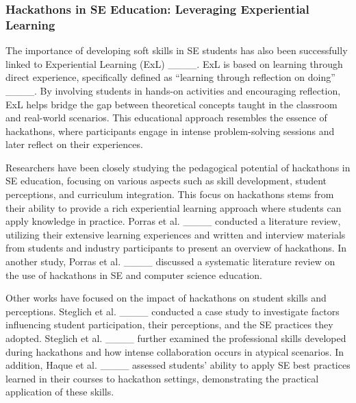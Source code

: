 

\subsubsection{Hackathons in SE Education: Leveraging Experiential Learning}
The importance of developing soft skills in SE students has also been successfully linked to Experiential Learning (ExL) ____. ExL is based on learning through direct experience, specifically defined as ``learning through reflection on doing'' ____. By involving students in hands-on activities and encouraging reflection, ExL helps bridge the gap between theoretical concepts taught in the classroom and real-world scenarios. This educational approach resembles the essence of hackathons, where participants engage in intense problem-solving sessions and later reflect on their experiences.

Researchers have been closely studying the pedagogical potential of hackathons in SE education, focusing on various aspects such as skill development, student perceptions, and curriculum integration. This focus on hackathons stems from their ability to provide a rich experiential learning approach where students can apply knowledge in practice. Porras et al. ____ conducted a literature review, utilizing their extensive learning experiences and written and interview materials from students and industry participants to present an overview of hackathons. In another study, Porras et al. ____ discussed a systematic literature review on the use of hackathons in SE and computer science education. 



Other works have focused on the impact of hackathons on student skills and perceptions.  Steglich et al. ____ conducted a case study to investigate factors influencing student participation, their perceptions, and the SE practices they adopted. Steglich et al. ____ further examined the professional skills developed during hackathons and how intense collaboration occurs in atypical scenarios. In addition, Haque et al. ____ assessed students' ability to apply SE best practices learned in their courses to hackathon settings, demonstrating the practical application of these skills.

